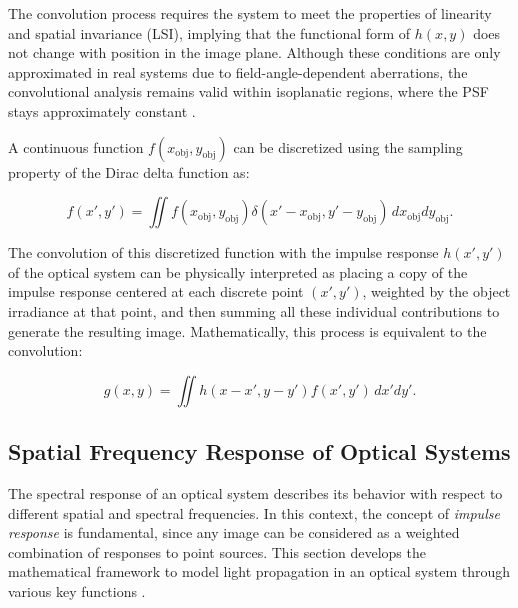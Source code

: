 The convolution process requires the system to meet the properties of linearity and spatial invariance (LSI), implying that the functional form of \( h(x,y) \) does not change with position in the image plane. Although these conditions are only approximated in real systems due to field-angle-dependent aberrations, the convolutional analysis remains valid within isoplanatic regions, where the PSF stays approximately constant \cite{Boreman2001ModulationTT52}.

A continuous function \( f(x_{\text{obj}},y_{\text{obj}}) \) can be discretized using the sampling property of the Dirac delta function as:

\begin{equation}
f(x',y') = \iint f(x_{\text{obj}},y_{\text{obj}}) \delta(x'-x_{\text{obj}}, y'-y_{\text{obj}})\,dx_{\text{obj}}dy_{\text{obj}}.
\end{equation}

The convolution of this discretized function with the impulse response \( h(x',y') \) of the optical system can be physically interpreted as placing a copy of the impulse response centered at each discrete point \((x', y')\), weighted by the object irradiance at that point, and then summing all these individual contributions to generate the resulting image. Mathematically, this process is equivalent to the convolution:

\begin{equation}
g(x,y) = \iint h(x-x', y-y') f(x',y')\, dx'dy'.
\end{equation}


\subsection{Spatial Frequency Response of Optical Systems}

The spectral response of an optical system describes its behavior with respect to different spatial and spectral frequencies. In this context, the concept of \textit{impulse response} is fundamental, since any image can be considered as a weighted combination of responses to point sources. This section develops the mathematical framework to model light propagation in an optical system through various key functions \cite{Boreman2001ModulationTT52}.

